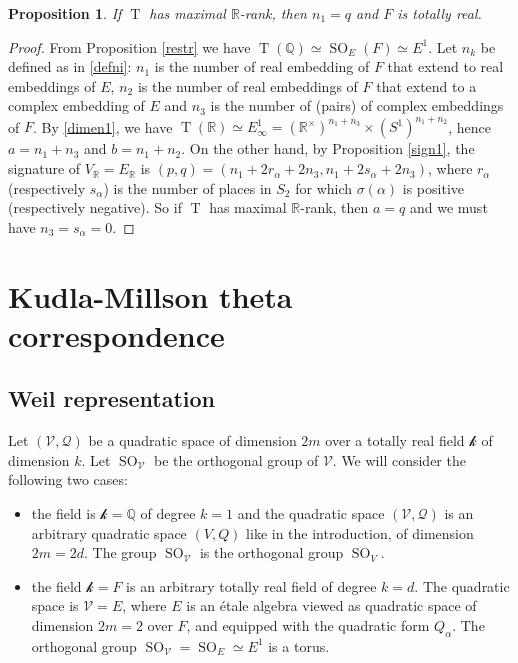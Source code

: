 \documentclass[11pt]{article} %
\newcommand{\8}{\infty}
\newcommand{\kbf}{\mathcal{k}}
\newcommand{\Tbf}{\operatorname{T}}
\newcommand{\SO}{\operatorname{SO}}
\newcommand{\R}{\mathbb{R}}
\newcommand{\Q}{\mathbb{Q}}
\newcommand{\Vcal}{\mathcal{V}}
\newcommand{\Qcal}{\mathcal{Q}}
\theoremstyle{mytheoremstyle}
\newtheorem{prop}[thm]{Proposition}
\theoremstyle{remark}
\numberwithin{equation}{section}
\begin{document}
\begin{prop} \label{rankcondi}
 If $\Tbf$ has maximal $\R$-rank, then $n_1=q$ and $F$ is totally real.
\end{prop}
\begin{proof} From Proposition \ref{restr} we have $\Tbf(\Q) \simeq \SO_{E}(F) \simeq E^1$. Let $n_k$ be defined as in \eqref{defni}: $n_1$ is the number of real embedding of $F$ that extend to real embeddings of $E$, $n_2$ is the number of real embeddings of $F$ that extend to a complex embedding of $E$ and $n_3$ is the number of (pairs) of complex embeddings of $F$. By \eqref{dimen1}, we have
    $\Tbf(\R) \simeq E_\8^1= (\R^{\times})^{n_1+n_3} \times (S^1)^{n_1+n_2}$, hence $a=n_1+n_3$ and $b=n_1+n_2$. On the other hand, by Proposition \ref{sign1}, the signature of $V_\R=E_\R$ is $(p,q)=(n_1+2r_\alpha+2n_3,n_1+2s_\alpha+2n_3)$, where $r_\alpha$ (respectively $s_\alpha$) is the number of places in $S_2$ for which $\sigma(\alpha)$ is positive (respectively negative). So if $\Tbf$ has maximal $\R$-rank, then $a=q$ and we must have $n_3=s_\alpha=0$.
\end{proof}










\section{Kudla-Millson theta correspondence}

\subsection{Weil representation} \label{subsecweil}
Let $(\Vcal,\Qcal)$ be a quadratic space of dimension $2m$ over a totally real field $\kbf$ of dimension $k$. Let $\SO_{\Vcal}$ be the orthogonal group of $\Vcal$. We will consider the following two cases:
\begin{itemize}
    \item[$-$] the field is $\kbf=\Q$ of degree $k=1$ and the quadratic space $(\Vcal,\Qcal)$ is an arbitrary quadratic space $(V,Q)$ like in the introduction, of dimension $2m=2d$. The group $\SO_{\Vcal}$ is the orthogonal group $\SO_V$.
    \item[$-$] the field $\kbf=F$ is an arbitrary totally real field of degree $k=d$. The quadratic space is $\Vcal=E$, where $E$ is an \'etale algebra viewed as quadratic space of dimension $2m=2$ over $F$, and equipped with the quadratic form $Q_\alpha$. The orthogonal group $\SO_{\Vcal}=\SO_E \simeq E^1$ is a torus.
\end{itemize}
\end{document}
